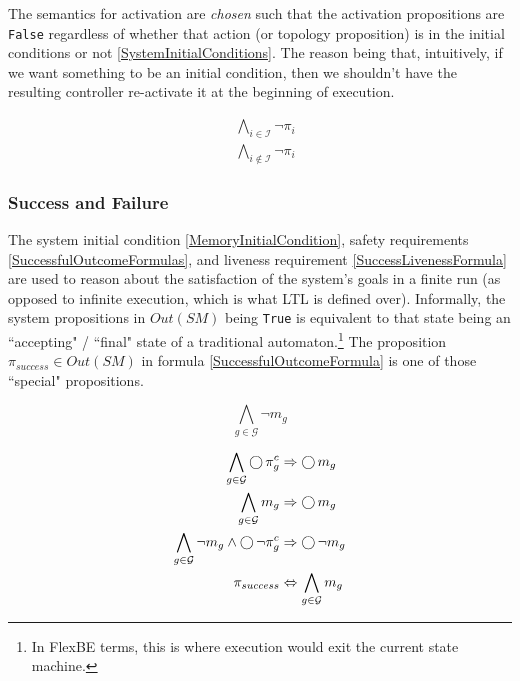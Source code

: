 The semantics for activation are \textit{chosen} such that the activation propositions are \texttt{False} regardless of whether that action (or topology proposition) is in the initial conditions or not \eqref{SystemInitialConditions}.
The reason being that, intuitively, if we want something to be an initial condition, then we shouldn't have the resulting controller re-activate it at the beginning of execution.

\begin{subequations}
	\label{SystemInitialConditions}
	\begin{align}
		&\bigwedge \limits_{i \in \mathcal{I}} \lnot \pi_i \label{SystemInitialConditions1}\\
		&\bigwedge \limits_{i \not \in \mathcal{I}} \lnot \pi_i \label{SystemInitialConditions2}
	\end{align}
\end{subequations}



\subsubsection{Success and Failure}

The system initial condition \eqref{MemoryInitialCondition}, safety requirements \eqref{SuccessfulOutcomeFormulas}, and liveness requirement \eqref{SuccessLivenessFormula} are used to reason about the satisfaction of the system's goals in a finite run (as opposed to infinite execution, which is what LTL is defined over).
Informally, the system propositions in $Out(SM)$ being \texttt{True} is equivalent to that state being an ``accepting" / ``final" state of a traditional automaton.\footnote{In FlexBE terms, this is where execution would exit the current state machine.}
The proposition $\pi_{success} \in Out(SM)$ in formula \eqref{SuccessfulOutcomeFormula} is one of those ``special" propositions.

\begin{equation}\label{MemoryInitialCondition}
	\bigwedge \limits_{g \in \mathcal{G}} \lnot m_g 
\end{equation}

\begin{subequations}
	\label{SuccessfulOutcomeFormulas}
	\begin{align}
		\bigwedge \limits_{g \in \mathcal{G}} \operatorname{\bigcirc} \pi_g^c &\Rightarrow \operatorname{\bigcirc} m_g \label{SuccessfulOutcomeFormula1}\\
		\bigwedge \limits_{g \in \mathcal{G}} m_g &\Rightarrow \operatorname{\bigcirc} m_g\label{SuccessfulOutcomeFormula2}\\
		\bigwedge \limits_{g \in \mathcal{G}} \lnot m_g \wedge \operatorname{\bigcirc} \lnot \pi_g^c &\Rightarrow \operatorname{\bigcirc} \lnot m_g\label{SuccessfulOutcomeFormula3}\\
		\pi_{success} &\Leftrightarrow \bigwedge \limits_{g \in \mathcal{G}} m_g\label{SuccessfulOutcomeFormula}
	\end{align}
\end{subequations}

